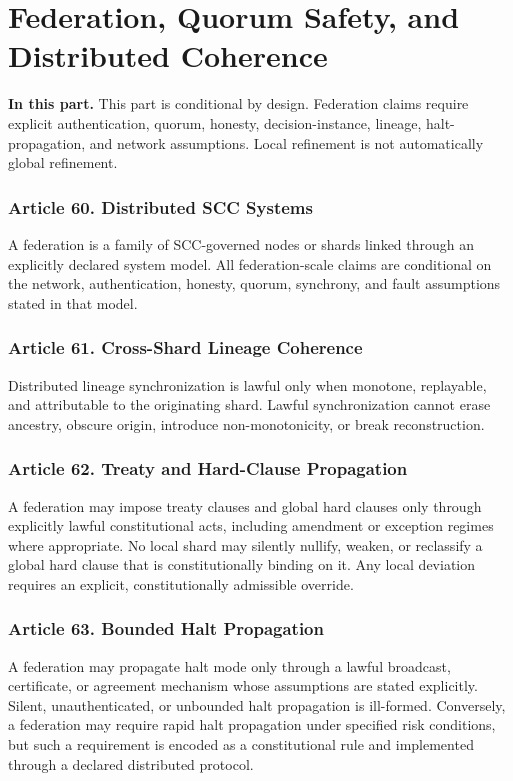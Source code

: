 \documentclass[10pt,oneside]{article}
\theoremstyle{definition}
\theoremstyle{remark}
\newcommand{\PartIntro}[1]{\noindent\textbf{In this part.} #1\par\medskip}
\begin{document}
\part{Federation, Quorum Safety, and Distributed Coherence}

\PartIntro{This part is conditional by design. Federation claims require explicit authentication, quorum, honesty, decision-instance, lineage, halt-propagation, and network assumptions. Local refinement is not automatically global refinement.}

\section{Article 60. Distributed SCC Systems}
A federation is a family of SCC-governed nodes or shards linked through an explicitly declared system model. All federation-scale claims are conditional on the network, authentication, honesty, quorum, synchrony, and fault assumptions stated in that model.

\section{Article 61. Cross-Shard Lineage Coherence}
Distributed lineage synchronization is lawful only when monotone, replayable, and attributable to the originating shard. Lawful synchronization cannot erase ancestry, obscure origin, introduce non-monotonicity, or break reconstruction.

\section{Article 62. Treaty and Hard-Clause Propagation}
A federation may impose treaty clauses and global hard clauses only through explicitly lawful constitutional acts, including amendment or exception regimes where appropriate. No local shard may silently nullify, weaken, or reclassify a global hard clause that is constitutionally binding on it. Any local deviation requires an explicit, constitutionally admissible override.

\section{Article 63. Bounded Halt Propagation}
A federation may propagate halt mode only through a lawful broadcast, certificate, or agreement mechanism whose assumptions are stated explicitly. Silent, unauthenticated, or unbounded halt propagation is ill-formed. Conversely, a federation may require rapid halt propagation under specified risk conditions, but such a requirement is encoded as a constitutional rule and implemented through a declared distributed protocol.
\end{document}
